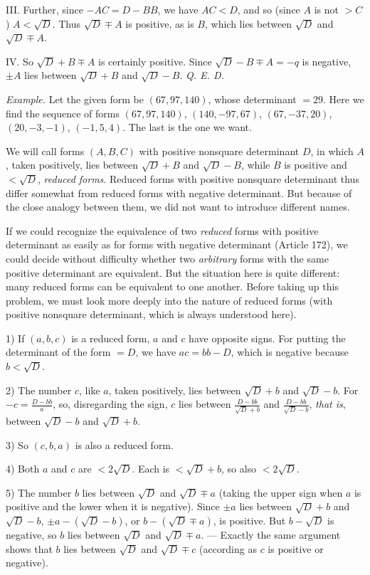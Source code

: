 III. Further, since $-AC=D-BB$, we have $AC<D$, and so (since $A$ is not $>C$) $A<\surd D$. Thus $\surd D\mp A$ is positive, as is $B$, which lies between $\surd D$ and $\surd D\mp A$.

IV. So $\surd D+B\mp A$ is certainly positive. Since $\surd D-B\mp A=-q$ is negative, $\pm A$ lies between $\surd D+B$ and $\surd D-B$. \textit{Q. E. D.}

\textit{Example.} Let the given form be $(67,97,140)$, whose determinant $=29$. Here we find the sequence of forms $(67,97,140)$, $(140,-97,67)$, $(67,-37,20)$, $(20,-3,-1)$, $(-1,5,4)$. The last is the one we want.

We will call forms $(A,B,C)$ with positive nonsquare determinant $D$, in which $A$, taken positively, lies between $\surd D+B$ and $\surd D-B$, while $B$ is positive and $<\surd D$, \textit{reduced forms}. Reduced forms with positive nonsquare determinant thus differ somewhat from reduced forms with negative determinant. But because of the close analogy between them, we did not want to introduce different names.

If we could recognize the equivalence of two \textit{reduced} forms with positive determinant as easily as for forms with negative determinant (Article 172), we could decide without difficulty whether two \textit{arbitrary} forms with the same positive determinant are equivalent. But the situation here is quite different: many reduced forms can be equivalent to one another. Before taking up this problem, we must look more deeply into the nature of reduced forms (with positive nonsquare determinant, which is always understood here).

1) If $(a,b,c)$ is a reduced form, $a$ and $c$ have opposite signs. For putting the determinant of the form $=D$, we have $ac=bb-D$, which is negative because $b<\surd D$.

2) The number $c$, like $a$, taken positively, lies between $\surd D+b$ and $\surd D-b$. For $-c=\frac{D-bb}{a}$, so, disregarding the sign, $c$ lies between $\frac{D-bb}{\surd D+b}$ and $\frac{D-bb}{\surd D-b}$, \textit{that is}, between $\surd D-b$ and $\surd D+b$.

3) So $(c,b,a)$ is also a reduced form.

4) Both $a$ and $c$ are $<2\surd D$. Each is $<\surd D+b$, so also $<2\surd D$.

5) The number $b$ lies between $\surd D$ and $\surd D\mp a$ (taking the upper sign when $a$ is positive and the lower when it is negative). Since $\pm a$ lies between $\surd D+b$ and $\surd D-b$, $\pm a-(\surd D-b)$, or $b-(\surd D\mp a)$, is positive. But $b-\surd D$ is negative, so $b$ lies between $\surd D$ and $\surd D\mp a$. --- Exactly the same argument shows that $b$ lies between $\surd D$ and $\surd D\mp c$ (according as $c$ is positive or negative).

